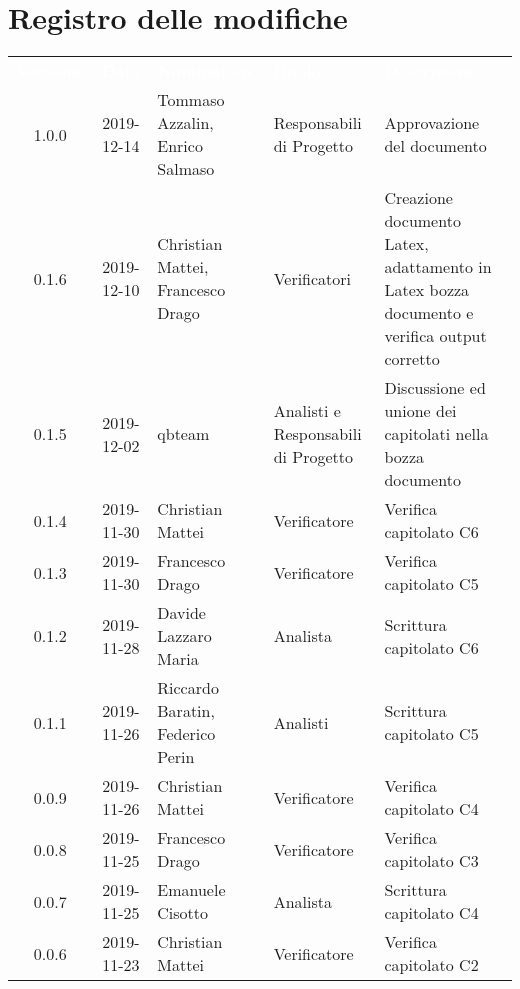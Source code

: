 \section*{Registro delle modifiche}
{
\renewcommand{\arraystretch}{1.5}
\centering
\begin{longtable}{ c c  C{4cm}  C{3cm} C{4cm}}
\textcolor{white}{\textbf{Versione}} & \textcolor{white}{\textbf{Data}} & \textcolor{white}{\textbf{Nominativo}} & \textcolor{white}{\textbf{Ruolo}} & \textcolor{white}{\textbf{Descrizione}}\\	

1.0.0 & 2019-12-14 & Tommaso Azzalin, Enrico Salmaso & Responsabili di Progetto & Approvazione del documento \\	
		
0.1.6 & 2019-12-10 & Christian Mattei, Francesco Drago & Verificatori & Creazione documento Latex, adattamento in Latex bozza documento e verifica output corretto\\

0.1.5 & 2019-12-02 & qbteam & Analisti e Responsabili di Progetto & Discussione ed unione dei capitolati nella bozza documento \\

0.1.4 & 2019-11-30 & Christian Mattei & Verificatore & Verifica capitolato C6 \\

0.1.3 & 2019-11-30 & Francesco Drago & Verificatore & Verifica capitolato C5 \\

0.1.2 & 2019-11-28 & Davide Lazzaro Maria & Analista & Scrittura capitolato C6 \\

0.1.1 & 2019-11-26 & Riccardo Baratin, Federico Perin & Analisti & Scrittura capitolato C5 \\

0.0.9 & 2019-11-26 & Christian Mattei & Verificatore & Verifica capitolato C4 \\

0.0.8 & 2019-11-25 & Francesco Drago & Verificatore & Verifica capitolato C3 \\

0.0.7 & 2019-11-25 & Emanuele Cisotto & Analista & Scrittura capitolato C4 \\

0.0.6 & 2019-11-23 & Christian Mattei & Verificatore & Verifica capitolato C2 \\


\end{longtable}}
